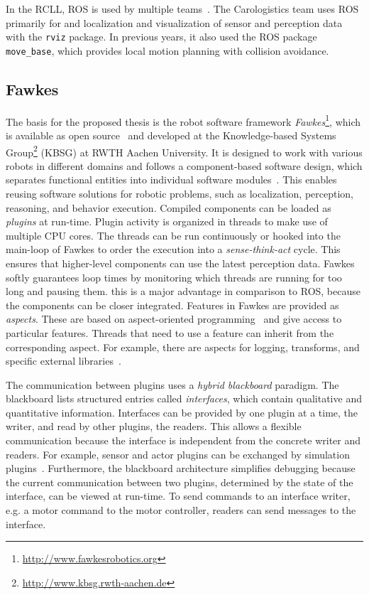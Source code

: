 In the RCLL, ROS is used by multiple teams~\cite{rc-2014}. The
Carologistics team uses ROS primarily for and localization and
visualization of sensor and perception data with the \texttt{rviz}
package. In previous years, it also used the ROS package
\texttt{move\_base}, which provides local motion planning with
collision avoidance.

\subsection{Fawkes}
\label{sec:fawkes}
The basis for the proposed thesis is the robot software framework
\emph{Fawkes}\footnote{\url{http://www.fawkesrobotics.org}}, which is
available as open source~\cite{FawkesDesign,Fawkes-RCLL-2014} and
developed at the Knowledge-based Systems
Group\footnote{\url{http://www.kbsg.rwth-aachen.de}} (KBSG) at RWTH
Aachen University.  It is designed to work with various robots in
different domains and follows a component-based software design, which
separates functional entities into individual software
modules~\cite{component}. This enables reusing software solutions for
robotic problems, such as localization, perception, reasoning, and
behavior execution. Compiled components can be loaded as
\emph{plugins} at run-time.
%
Plugin activity is organized in threads to make use of multiple CPU
cores. The threads can be run continuously or hooked into the
main-loop of Fawkes to order the execution into a
\emph{sense-think-act} cycle.  This ensures that higher-level
components can use the latest perception data.  Fawkes softly
guarantees loop times by monitoring which threads are running for too
long and pausing them. this is a major advantage in comparison to ROS,
because the components can be closer integrated. Features in Fawkes
are provided as \emph{aspects}. These are based on aspect-oriented
programming~\cite{aspect_oriented} and give access to particular
features. Threads that need to use a feature can inherit from the
corresponding aspect. For example, there are aspects for logging,
transforms, and specific external libraries~\cite{tnthesis}.

The communication between plugins uses a \emph{hybrid blackboard}
paradigm. The blackboard lists structured entries called
\emph{interfaces}, which contain qualitative and quantitative
information.  Interfaces can be provided by one plugin at a time, the
writer, and read by other plugins, the readers. This allows a flexible
communication because the interface is independent from the concrete
writer and readers.  For example, sensor and actor plugins can be
exchanged by simulation plugins~\cite{Gazsim-Thesis,LLSF-Sim}.
Furthermore, the blackboard architecture simplifies
debugging because the current communication between two plugins,
determined by the state of the interface, can be viewed at
run-time. To send commands to an interface writer, e.g. a motor
command to the motor controller, readers can send messages to the
interface.

